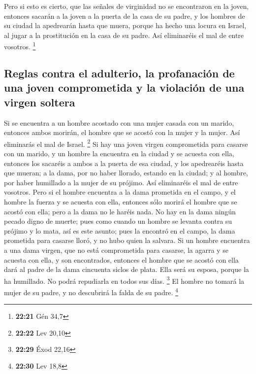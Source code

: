 \begin{paracol}{2}
 Pero si esto es cierto, que las señales de virginidad no
se encontraron en la joven,  entonces sacarán a la joven
a la puerta de la casa de su padre, y los hombres de su ciudad la
apedrearán hasta que muera, porque ha hecho una locura en Israel, al
jugar a la prostitución en la casa de su padre. Así eliminaréis el mal
de entre vosotros. \footnote{\textbf{22:21} Gén 34,7}

\hypertarget{reglas-contra-el-adulterio-la-profanaciuxf3n-de-una-joven-comprometida-y-la-violaciuxf3n-de-una-virgen-soltera}{%
\subsection{Reglas contra el adulterio, la profanación de una joven
comprometida y la violación de una virgen
soltera}\label{reglas-contra-el-adulterio-la-profanaciuxf3n-de-una-joven-comprometida-y-la-violaciuxf3n-de-una-virgen-soltera}}

 Si se encuentra a un hombre acostado con una mujer
casada con un marido, entonces ambos morirán, el hombre que se acostó
con la mujer y la mujer. Así eliminarás el mal de Israel. \footnote{\textbf{22:22}
  Lev 20,10}  Si hay una joven virgen comprometida para
casarse con un marido, y un hombre la encuentra en la ciudad y se
acuesta con ella,  entonces los sacaréis a ambos a la
puerta de esa ciudad, y los apedrearéis hasta que mueran; a la dama, por
no haber llorado, estando en la ciudad; y al hombre, por haber humillado
a la mujer de su prójimo. Así eliminaréis el mal de entre vosotros.
 Pero si el hombre encuentra a la dama prometida en el
campo, y el hombre la fuerza y se acuesta con ella, entonces sólo morirá
el hombre que se acostó con ella;  pero a la dama no le
haréis nada. No hay en la dama ningún pecado digno de muerte; pues como
cuando un hombre se levanta contra su prójimo y lo mata, así es este
asunto;  pues la encontró en el campo, la dama prometida
para casarse lloró, y no hubo quien la salvara.  Si un
hombre encuentra a una dama virgen, que no está comprometida para
casarse, la agarra y se acuesta con ella, y son encontrados,
 entonces el hombre que se acostó con ella dará al padre
de la dama cincuenta siclos de plata. Ella será su esposa, porque la ha
humillado. No podrá repudiarla en todos sus días. \footnote{\textbf{22:29}
  Éxod 22,16}  El hombre no tomará la mujer de su padre,
y no descubrirá la falda de su padre. \footnote{\textbf{22:30} Lev 18,8}


\end{paracol}
